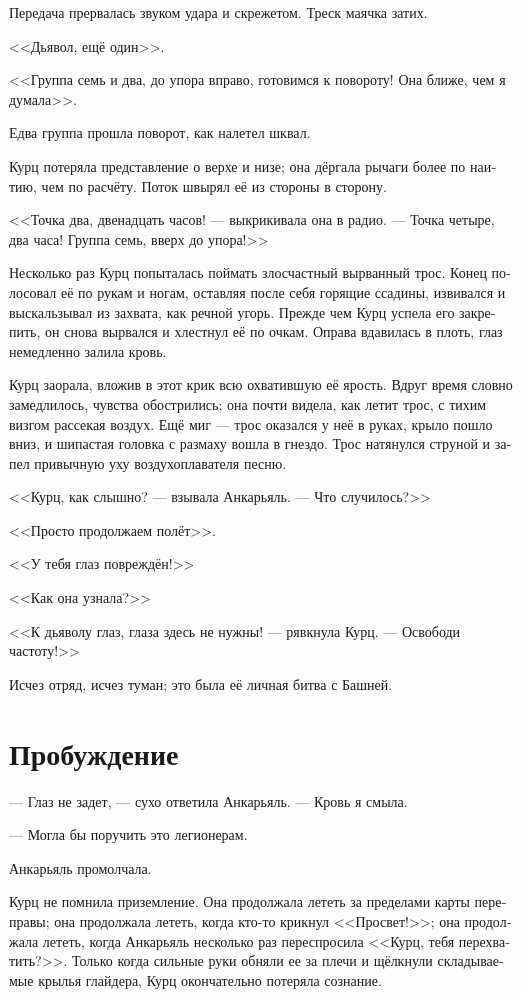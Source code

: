 \documentclass[a4paper,10pt,fleqn]{book}\usepackage{polyglossia}\setdefaultlanguage[babelshorthands=true]{russian}\setotherlanguage{english}\defaultfontfeatures{Ligatures=TeX,Mapping=tex-text}\usepackage{xcolor}\newcommand{\ml}[3]{#2}
\begin{document}
Передача прервалась звуком удара и скрежетом.
Треск маячка затих.

<<Дьявол, ещё один>>.

<<Группа семь и два, до упора вправо, готовимся к повороту!
Она ближе, чем я думала>>.

Едва группа прошла поворот, как налетел шквал.

Курц потеряла представление о верхе и низе;
она дёргала рычаги более по наитию, чем по расчёту.
Поток швырял её из стороны в сторону.

<<Точка два, двенадцать часов! --- выкрикивала она в радио.
--- Точка четыре, два часа!
Группа семь, вверх до упора!>>

Несколько раз Курц попыталась поймать злосчастный вырванный трос.
Конец полосовал её по рукам и ногам, оставляя после себя горящие ссадины, извивался и выскальзывал из захвата, как речной угорь.
Прежде чем Курц успела его закрепить, он снова вырвался и хлестнул её по очкам.
Оправа вдавилась в плоть, глаз немедленно залила кровь.

Курц заорала, вложив в этот крик всю охватившую её ярость.
Вдруг время словно замедлилось, чувства обострились;
она почти видела, как летит трос, с тихим визгом рассекая воздух.
Ещё миг --- трос оказался у неё в руках, крыло пошло вниз, и шипастая головка с размаху вошла в гнездо.
Трос натянулся струной и запел привычную уху воздухоплавателя песню.

<<Курц, как слышно? --- взывала Анкарьяль.
--- Что случилось?>>

<<Просто продолжаем полёт>>.

<<У тебя глаз повреждён!>>

<<Как она узнала?>>

<<К дьяволу глаз, глаза здесь не нужны! --- рявкнула Курц.
--- Освободи частоту!>>

Исчез отряд, исчез туман;
это была её личная битва с Башней.

\section{Пробуждение}

--- Глаз не задет, --- сухо ответила Анкарьяль.
--- Кровь я смыла.

--- Могла бы поручить это легионерам.

Анкарьяль промолчала.

Курц не помнила приземление.
Она продолжала лететь за пределами карты переправы;
она продолжала лететь, когда кто-то крикнул <<Просвет!>>;
она продолжала лететь, когда Анкарьяль несколько раз переспросила <<Курц, тебя перехватить?>>.
Только когда сильные руки обняли ее за плечи и щёлкнули складываемые крылья глайдера, Курц окончательно потеряла сознание.
\end{document}
